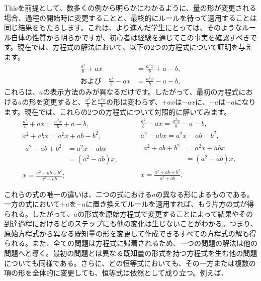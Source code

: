 \documentclass[a4paper,11pt,openany]{ltjsbook}
\begin{document}
Thisを前提として、数多くの例から明らかにわかるように、量の形が変更される場合、過程の開始時に変更することと、最終的にルールを待って適用することは同じ結果をもたらします。これは、より進んだ学生にとっては、そのようなルール自体の性質から明らかですが、初心者は経験を通じてこの事実を確認すべきです。現在では、方程式の解法において、以下の2つの方程式について証明を与えます。
\begin{align*}
\frac{a^{2}}{b} + ax &= \frac{a^{2} x}{b} + a - b, \\
\text{および}\quad
\frac{a^{2}}{b} - ax &= \frac{a^{2} x}{b} - a - b,
\end{align*}
これらは、$a$の表示方法のみが異なるだけです。したがって、最初の方程式における$a$の形を変更すると、$\frac{a^{2}}{b}$と$\frac{a^{2} x}{b}$の形は変わらず、$+ax$は$-ax$に、$+a$は$-a$になります。現在では、これらの2つの方程式について対照的に解いてみます。
\[
\begin{gathered}
\frac{a^{2}}{b} + ax = \frac{a^{2} x}{b} + a - b, \\
a^{2} + abx = a^{2} x + ab - b^{2}, \\
\begin{aligned}
a^{2} - ab + b^{2}
  &= a^{2} x - abx \\
  &= (a^{2} - ab)x,
\end{aligned} \\
x = \frac{a^{2} - ab + b^{2}}{a^{2} - ab};
\end{gathered}\qquad
\begin{gathered}
\frac{a^{2}}{b} - ax = \frac{a^{2} x}{b} - a - b, \\
a^{2} - abx = a^{2} x - ab - b^{2}, \\
\begin{aligned}
a^{2} + ab + b^{2}
  &= a^{2} x + abx \\
  &= (a^{2} + ab)x,
\end{aligned} \\
x = \frac{a^{2} + ab + b^{2}}{a^{2} + ab}.
\end{gathered}
\]

これらの式の唯一の違いは、二つの式における$a$の異なる形によるものである。一方の式において$+a$を$-a$に置き換えてルールを適用すれば、もう片方の式が得られる。したがって、$a$の形式を原始方程式で変更することによって結果やその到達過程におけるどのステップにも他の変化は生じないことがわかる。つまり、原始方程式から異なる既知量の形を変更して作成できるすべての方程式の解も得られる。また、全ての問題は方程式に帰着されるため、一つの問題の解法は他の問題へと導く。最初の問題とは異なる既知量の形式を持つ方程式を生む他の問題についても同様である。さらに、どの恒等式においても、その一方または複数の項の形を全体的に変更しても、恒等式は依然として成り立つ。例えば、
\end{document}
